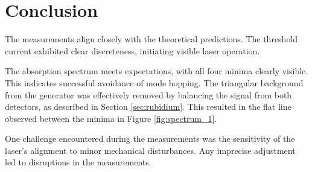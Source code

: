 \section{Conclusion}
The measurements align closely with the theoretical predictions. 
The threshold current exhibited clear discreteness, initiating 
visible laser operation.

\noindent
The absorption spectrum meets expectations, with all four minima 
clearly visible. This indicates successful avoidance of mode hopping. 
The triangular background from the generator was effectively removed 
by balancing the signal from both detectors, as described in Section 
\ref{sec:rubidium}. This resulted in the flat line observed between 
the minima in Figure \ref{fig:spectrum_1}.

\noindent
One challenge encountered during the measurements was the sensitivity 
of the laser's alignment to minor mechanical disturbances. Any 
imprecise adjustment led to disruptions in the measurements.

